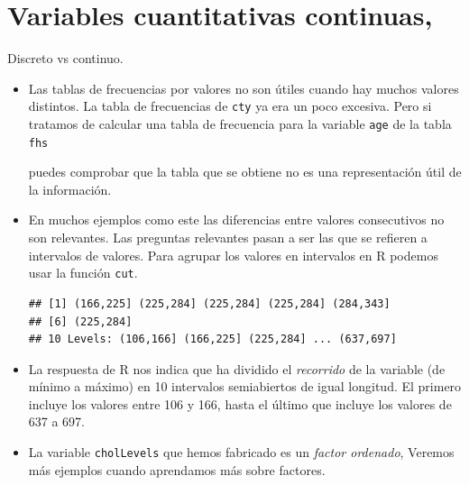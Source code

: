 \documentclass[
  9pt,
  ignorenonframetext,
]{beamer}
\newenvironment{Shaded}{\begin{snugshade}}{\end{snugshade}}
\newcommand{\DataTypeTok}[1]{\textcolor[rgb]{0.13,0.29,0.53}{#1}}
\newcommand{\DecValTok}[1]{\textcolor[rgb]{0.00,0.00,0.81}{#1}}
\newcommand{\KeywordTok}[1]{\textcolor[rgb]{0.13,0.29,0.53}{\textbf{#1}}}
\newcommand{\NormalTok}[1]{#1}
\newcommand{\OperatorTok}[1]{\textcolor[rgb]{0.81,0.36,0.00}{\textbf{#1}}}
\newcommand{\StringTok}[1]{\textcolor[rgb]{0.31,0.60,0.02}{#1}}
\begin{document}
\hypertarget{variables-cuantitativas-continuas}{%
\section{Variables cuantitativas
continuas,}\label{variables-cuantitativas-continuas}}

\begin{frame}[fragile]{Discreto vs continuo.}
\protect\hypertarget{discreto-vs-continuo.}{}

\begin{itemize}
\item
  Las tablas de frecuencias por valores no son útiles cuando hay muchos
  valores distintos. La tabla de frecuencias de \texttt{cty} ya era un
  poco excesiva. Pero si tratamos de calcular una tabla de frecuencia
  para la variable \texttt{age} de la tabla \texttt{fhs}

\begin{Shaded}
\end{Shaded}

  puedes comprobar que la tabla que se obtiene no es una representación
  útil de la información.
\item
  En muchos ejemplos como este las diferencias entre valores
  consecutivos no son relevantes. Las preguntas relevantes pasan a ser
  las que se refieren a intervalos de valores. Para agrupar los valores
  en intervalos en R podemos usar la función \texttt{cut}. \scriptsize

\begin{Shaded}
\end{Shaded}

\begin{verbatim}
## [1] (166,225] (225,284] (225,284] (225,284] (284,343]
## [6] (225,284]
## 10 Levels: (106,166] (166,225] (225,284] ... (637,697]
\end{verbatim}
\end{itemize}

\normalsize

\begin{itemize}
\item
  La respuesta de R nos indica que ha dividido el \emph{recorrido} de la
  variable (de mínimo a máximo) en 10 intervalos semiabiertos de igual
  longitud. El primero incluye los valores entre 106 y 166, hasta el
  último que incluye los valores de 637 a 697.
\item
  La variable \texttt{cholLevels} que hemos fabricado es un \emph{factor
  ordenado}, Veremos más ejemplos cuando aprendamos más sobre factores.
\end{itemize}

\end{frame}
\end{document}
